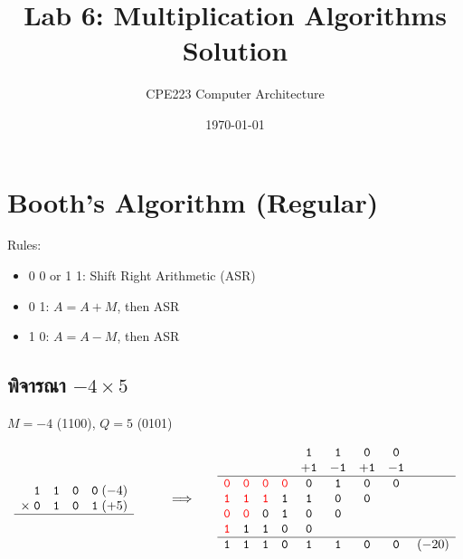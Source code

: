 \documentclass[12pt]{article}
\newcommand{\bit}[1]{\mathtt{#1}}
\newcommand{\rbit}[1]{\textcolor{red}{\mathtt{#1}}}
\newcommand{\coef}[1]{\mathtt{#1}}
\newcommand{\blank}{\phantom{\bit{0}}}
\begin{document}
\title{Lab 6: Multiplication Algorithms Solution}
\author{CPE223 Computer Architecture}
\date{\today}
\maketitle

\section{Booth's Algorithm (Regular)}
Rules: 
\begin{itemize}
    \item 0 0 or 1 1: Shift Right Arithmetic (ASR)
    \item 0 1: $A = A + M$, then ASR
    \item 1 0: $A = A - M$, then ASR
\end{itemize}

\subsection{พิจารณา $-4 \times 5$}
$M = -4$ (1100), $Q = 5$ (0101)

\[
\begin{array}{cc@{\qquad\Longrightarrow\qquad}c}
\begin{array}{c@{\;}cccc@{\;}l}
\phantom{\times}&\bit{1}&\bit{1}&\bit{0}&\bit{0}&(-4)\\
\times&\bit{0}&\bit{1}&\bit{0}&\bit{1}&(+5)\\
\hline
\end{array}
& &
\begin{array}{*{8}{c}l}
\blank&\blank&\blank&\blank&\bit{1}&\bit{1}&\bit{0}&\bit{0}&\\
\blank&\blank&\blank&\blank&\coef{+1}&\coef{-1}&\coef{+1}&\coef{-1}&\\
\hline
\rbit{0}&\rbit{0}&\rbit{0}&\rbit{0}&\bit{0}&\bit{1}&\bit{0}&\bit{0}&\\
\rbit{1}&\rbit{1}&\rbit{1}&\bit{1}&\bit{1}&\bit{0}&\bit{0}&\blank&\\
\rbit{0}&\rbit{0}&\bit{0}&\bit{1}&\bit{0}&\bit{0}&\blank&\blank&\\
\rbit{1}&\bit{1}&\bit{1}&\bit{0}&\bit{0}&\blank&\blank&\blank&\\
\hline
\bit{1}&\bit{1}&\bit{1}&\bit{0}&\bit{1}&\bit{1}&\bit{0}&\bit{0}&(-20)
\end{array}
\end{array}
\]
\end{document}
